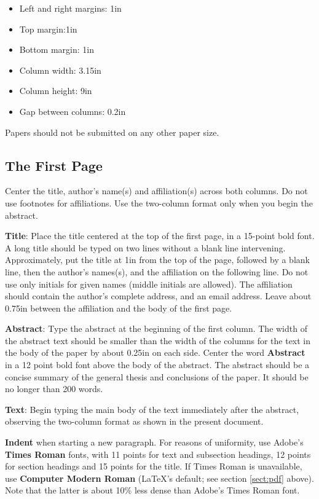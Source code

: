 \documentclass[11pt]{article}
\begin{document}
\begin{itemize}
\item Left and right margins: 1in
\item Top margin:1in
\item Bottom margin: 1in
\item Column width: 3.15in
\item Column height: 9in
\item Gap between columns: 0.2in
\end{itemize}

Papers should not be submitted on any other paper size. 

\subsection{The First Page}
\label{ssec:first}

Center the title, author's name(s) and affiliation(s) across both
columns. Do not use footnotes for affiliations.  Use the two-column
format only when you begin the abstract.

{\bf Title}: Place the title centered at the top of the first page, in
a 15-point bold font. A long title should be typed on two lines
without a blank line intervening. Approximately, put the title at 1in
from the top of the page, followed by a blank line, then the author's
names(s), and the affiliation on the following line.  Do not use only
initials for given names (middle initials are allowed). The
affiliation should contain the author's complete address, and an email
address. Leave about 0.75in between the affiliation and the body of
the first page.

{\bf Abstract}: Type the abstract at the beginning of the first
column.  The width of the abstract text should be smaller than the
width of the columns for the text in the body of the paper by about
0.25in on each side.  Center the word {\bf Abstract} in a 12 point
bold font above the body of the abstract. The abstract should be a
concise summary of the general thesis and conclusions of the paper.
It should be no longer than 200 words.

{\bf Text}: Begin typing the main body of the text immediately after
the abstract, observing the two-column format as shown in 
the present document.

{\bf Indent} when starting a new paragraph. For reasons of uniformity,
use Adobe's {\bf Times Roman} fonts, with 11 points for text and 
subsection headings, 12 points for section headings and 15 points for
the title. If Times Roman is unavailable, use {\bf Computer Modern
  Roman} (\LaTeX{}'s default; see section \ref{sect:pdf} above).
Note that the latter is about 10\% less dense than Adobe's Times Roman
font.
\end{document}
